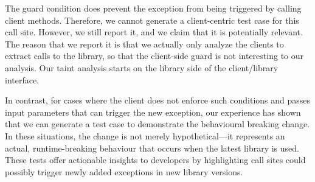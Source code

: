 The guard condition does prevent the exception from being triggered by calling client methods. Therefore, we cannot generate a client-centric test case for this call site. However, we still report it, and we claim that it is potentially relevant. The reason that we report it is that we actually only analyze the clients to extract calls to the library, so that the client-side guard is not interesting to our analysis. Our taint analysis starts on the library side of the client/library interface.

In contrast, for cases where the client does not enforce such conditions and passes input parameters that can trigger the new exception, our experience has shown that we can generate a test case to demonstrate the behavioural breaking change. In these situations, the change is not merely hypothetical—it represents an actual, runtime-breaking behaviour that occurs when the latest library is used. These tests offer actionable insights to developers by highlighting call sites could possibly trigger newly added exceptions in new library versions.

